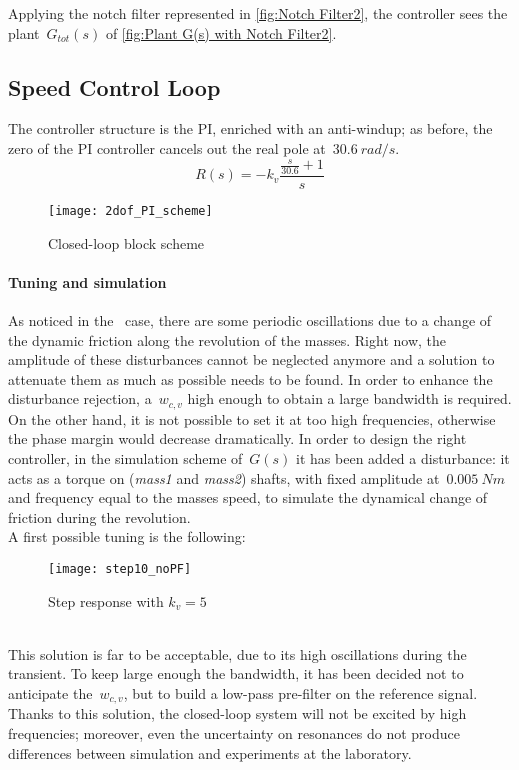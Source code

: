 Applying the notch filter represented in \cref{fig:Notch Filter2}, the controller sees the plant~$G_{tot}(s)$ of \cref{fig:Plant G(s) with Notch Filter2}.

\subsection{Speed Control Loop}
The controller structure is the PI, enriched with an anti-windup; as before, the zero of the PI controller cancels out the real pole at~$30.6\ rad/s$.
\[
R(s)=-k_v
\frac{\frac{s}{30.6}+1}{s}
\]
\begin{figure*}[h]
	\centering
	\texttt{[image: 2dof\_PI\_scheme]}
	\caption{Closed-loop block scheme}
\end{figure*}

\paragraph{Tuning and simulation}
As noticed in the \onedof~case, there are some periodic oscillations due to a change of the dynamic friction along the revolution of the masses. 
Right now, the amplitude of these disturbances cannot be neglected anymore and a solution to attenuate them as much as possible needs to be found. In order to enhance the disturbance rejection, a~$w_{c,v}$ high enough to obtain a large bandwidth is required. On the other hand, it is not possible to set it at too high frequencies, otherwise the phase margin would decrease dramatically. In order to design the right controller, in the simulation scheme of~$G(s)$ it has been added a disturbance: it acts as a torque on (\textit{mass1} and \textit{mass2}) shafts, with fixed amplitude at~$0.005\ Nm$ and frequency equal to the masses speed, to simulate the dynamical change of friction during the revolution. \\
A first possible tuning is the following:
\begin{figure*}[h]
	\centering
	\texttt{[image: step10\_noPF]}
	\caption{Step response with $k_v=5$}
	\label{fig:step10_noPF}
\end{figure*}
\\
This solution is far to be acceptable, due to its high oscillations during the transient. To keep large enough the bandwidth, it has been decided not to anticipate the~$w_{c,v}$, but to build a low-pass pre-filter on the reference signal. Thanks to this solution, the closed-loop system will not be excited by high frequencies; moreover, even the uncertainty on resonances do not produce differences between simulation and experiments at the laboratory.
